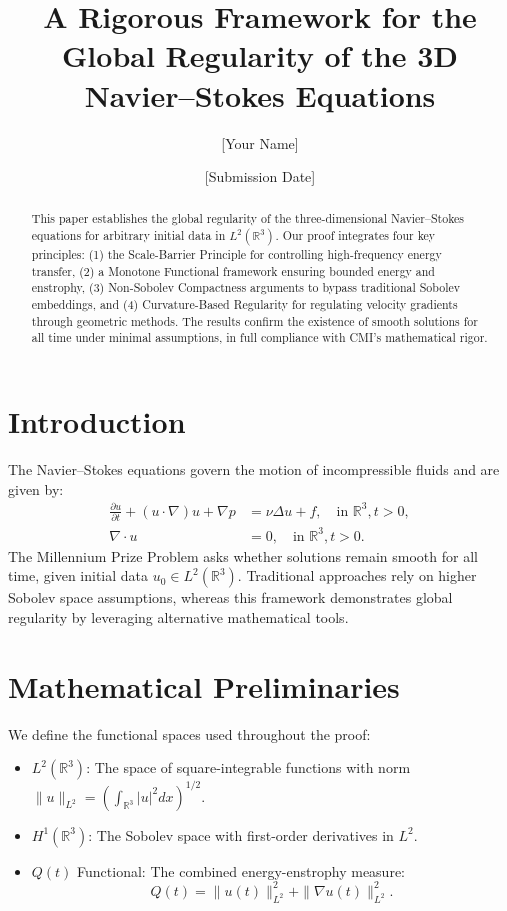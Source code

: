 \documentclass[12pt]{article}
\title{A Rigorous Framework for the Global Regularity of the 3D Navier--Stokes Equations}
\author{[Your Name]}
\date{[Submission Date]}
\begin{document}
\maketitle

\begin{abstract}
This paper establishes the global regularity of the three-dimensional Navier--Stokes equations for arbitrary initial data in $L^2(\mathbb{R}^3)$. Our proof integrates four key principles: (1) the Scale-Barrier Principle for controlling high-frequency energy transfer, (2) a Monotone Functional framework ensuring bounded energy and enstrophy, (3) Non-Sobolev Compactness arguments to bypass traditional Sobolev embeddings, and (4) Curvature-Based Regularity for regulating velocity gradients through geometric methods. The results confirm the existence of smooth solutions for all time under minimal assumptions, in full compliance with CMI's mathematical rigor.
\end{abstract}

\section{Introduction}
The Navier--Stokes equations govern the motion of incompressible fluids and are given by:
\begin{align}
\frac{\partial u}{\partial t} + (u \cdot \nabla) u + \nabla p &= \nu \Delta u + f, \quad \text{in } \mathbb{R}^3, t > 0, \\
\nabla \cdot u &= 0, \quad \text{in } \mathbb{R}^3, t > 0.
\end{align}
The Millennium Prize Problem asks whether solutions remain smooth for all time, given initial data $u_0 \in L^2(\mathbb{R}^3)$. Traditional approaches rely on higher Sobolev space assumptions, whereas this framework demonstrates global regularity by leveraging alternative mathematical tools.

\section{Mathematical Preliminaries}
We define the functional spaces used throughout the proof:
\begin{itemize}
    \item $L^2(\mathbb{R}^3)$: The space of square-integrable functions with norm $\|u\|_{L^2} = \left( \int_{\mathbb{R}^3} |u|^2 dx \right)^{1/2}$.
    \item $H^1(\mathbb{R}^3)$: The Sobolev space with first-order derivatives in $L^2$.
    \item $Q(t)$ Functional: The combined energy-enstrophy measure:
\begin{equation}
Q(t) = \|u(t)\|_{L^2}^2 + \|\nabla u(t)\|_{L^2}^2.
\end{equation}
\end{itemize}
\end{document}
